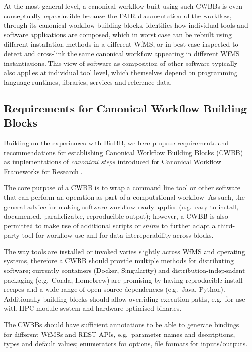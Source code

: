 At the most general level, a canonical workflow built using such CWBBs is even conceptually reproducible because the FAIR documentation of the workflow, through its canonical workflow building blocks, identifies how individual tools and software applications are composed, which in worst case can be rebuilt using different installation methods in a different WfMS, or in best case inspected to detect and cross-link the same canonical workflow appearing in different WfMS instantiations.
This view of software as composition of other software typically also applies at individual tool level, which themselves depend on programming language runtimes, libraries, services and reference data.

\subsection{Requirements for Canonical Workflow Building Blocks}\label{ch6:requirements-for-canonical-workflow-building-blocks}

Building on the experiences with BioBB, we here propose requirements and recommendations for establishing Canonical Workflow Building Blocks (CWBB) as implementations of \emph{canonical steps} introduced for Canonical Workflow Frameworks for Research \cite{cwfr}.

The core purpose of a CWBB is to wrap a command line tool or other software that can perform an operation as part of a computational workflow.
As such, the general advice for making software workflow-ready applies \cite{ch6-37} (e.g.~easy to install, documented, parallelizable, reproducible output); however, a CWBB is also permitted to make use of additional scripts or \emph{shims} to further adapt a third-party tool for workflow use and for data interoperability across blocks.

The way tools are installed or invoked varies slightly across WfMS and operating systems, therefore a CWBB should provide multiple methods for distributing software; currently containers (Docker, Singularity) and distribution-independent packaging (e.g.~Conda, Homebrew) are promising by having reproducible install recipes and a wide range of open source dependencies (e.g.~Java, Python).
Additionally building blocks should allow overriding execution paths, e.g.~for use with HPC module system and hardware-optimised binaries.

The CWBBs should have sufficient annotations to be able to generate bindings for different WfMSs and REST APIs, e.g.~parameter names and descriptions, types and default values; enumerators for options, file formats for inputs/outputs.

